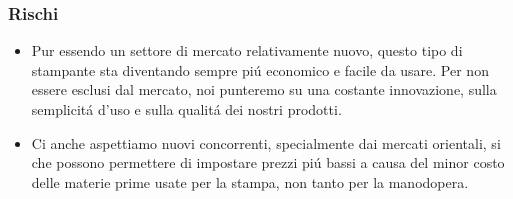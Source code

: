 \documentclass{beamer}
\begin{document}
    \begin{frame}
        \frametitle{Rischi}
            \begin{itemize}
                \item Pur essendo un settore di mercato relativamente nuovo, 
questo tipo  di stampante sta diventando sempre pi\'u economico e facile da 
usare. Per non essere esclusi dal mercato, noi punteremo su una costante 
innovazione, sulla semplicit\'a d'uso e sulla qualit\'a dei nostri prodotti.
                \item Ci anche aspettiamo nuovi concorrenti, specialmente dai 
mercati orientali, si che possono permettere di impostare prezzi pi\'u bassi a 
causa del minor costo delle materie prime usate per la stampa, non tanto per la 
manodopera.
            \end{itemize}
    \end{frame}
\end{document}
